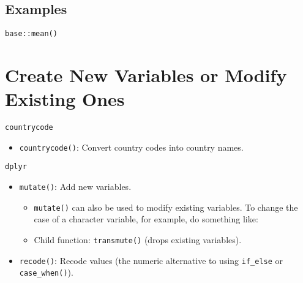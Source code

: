 \documentclass[
]{book}
\newenvironment{Shaded}{\begin{snugshade}}{\end{snugshade}}
\newcommand{\AttributeTok}[1]{\textcolor[rgb]{0.77,0.63,0.00}{#1}}
\newcommand{\CommentTok}[1]{\textcolor[rgb]{0.56,0.35,0.01}{\textit{#1}}}
\newcommand{\DecValTok}[1]{\textcolor[rgb]{0.00,0.00,0.81}{#1}}
\newcommand{\FunctionTok}[1]{\textcolor[rgb]{0.00,0.00,0.00}{#1}}
\newcommand{\NormalTok}[1]{#1}
\newcommand{\OtherTok}[1]{\textcolor[rgb]{0.56,0.35,0.01}{#1}}
\newcommand{\SpecialCharTok}[1]{\textcolor[rgb]{0.00,0.00,0.00}{#1}}
\providecommand{\tightlist}{%
  \setlength{\itemsep}{0pt}\setlength{\parskip}{0pt}}
\begin{document}
\hypertarget{examples-3}{%
\subsection{Examples}\label{examples-3}}

\texttt{base::mean()}

\begin{Shaded}
\end{Shaded}

\hypertarget{create-new-variables-or-modify-existing-ones}{%
\section{Create New Variables or Modify Existing Ones}\label{create-new-variables-or-modify-existing-ones}}

\texttt{countrycode}

\begin{itemize}
\tightlist
\item
  \texttt{countrycode()}: Convert country codes into country names.
\end{itemize}

\texttt{dplyr}

\begin{itemize}
\tightlist
\item
  \texttt{mutate()}: Add new variables.

  \begin{itemize}
  \tightlist
  \item
    \texttt{mutate()} can also be used to modify existing variables. To change the case of a character variable, for example, do something like:
  \item
    Child function: \texttt{transmute()} (drops existing variables).
  \end{itemize}
\item
  \texttt{recode()}: Recode values (the numeric alternative to using \texttt{if\_else} or \texttt{case\_when()}).
\end{itemize}
\end{document}
